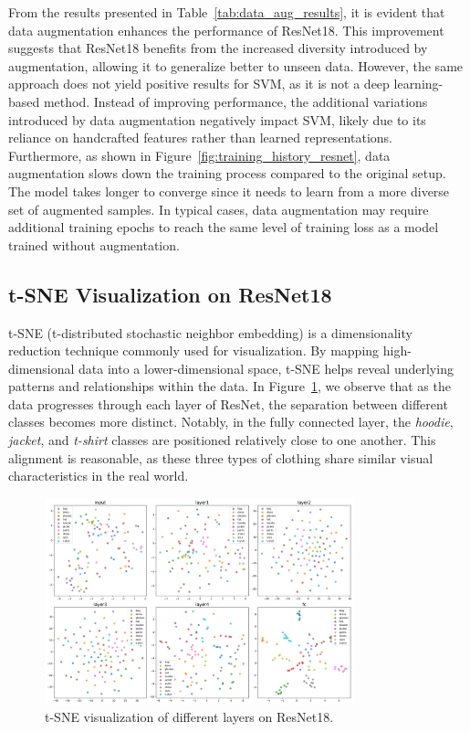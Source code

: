 \documentclass[12pt]{article}
\begin{document}
    From the results presented in Table~\ref{tab:data_aug_results}, it is evident that data augmentation enhances the performance of ResNet18. This improvement suggests that ResNet18 benefits from the increased diversity introduced by augmentation, allowing it to generalize better to unseen data. However, the same approach does not yield positive results for SVM, as it is not a deep learning-based method. Instead of improving performance, the additional variations introduced by data augmentation negatively impact SVM, likely due to its reliance on handcrafted features rather than learned representations.\\[5pt]
    Furthermore, as shown in Figure~\ref{fig:training_history_resnet}, data augmentation slows down the training process compared to the original setup. The model takes longer to converge since it needs to learn from a more diverse set of augmented samples. In typical cases, data augmentation may require additional training epochs to reach the same level of training loss as a model trained without augmentation.

    \subsection{t-SNE Visualization on ResNet18}
    t-SNE (t-distributed stochastic neighbor embedding) is a dimensionality reduction technique commonly used for visualization. By mapping high-dimensional data into a lower-dimensional space, t-SNE helps reveal underlying patterns and relationships within the data. In Figure~\ref{fig:tsne_resnet}, we observe that as the data progresses through each layer of ResNet, the separation between different classes becomes more distinct. Notably, in the fully connected layer, the \textit{hoodie}, \textit{jacket}, and \textit{t-shirt} classes are positioned relatively close to one another. This alignment is reasonable, as these three types of clothing share similar visual characteristics in the real world.
    \begin{figure}[h]
        \centering
        \includegraphics[width=0.8\textwidth]{figure/resnet_tsne_comparison.png}
        \caption{t-SNE visualization of different layers on ResNet18.} 
        \label{fig:tsne_resnet}
    \end{figure}
\end{document}

